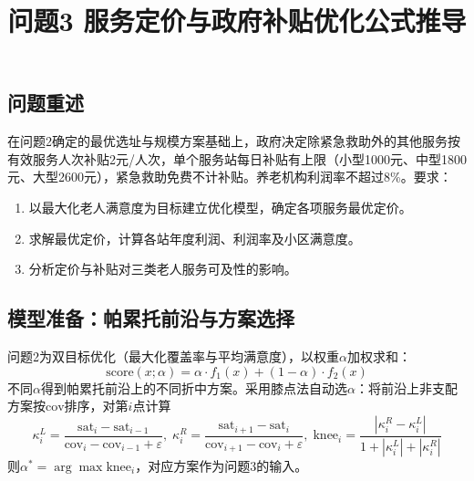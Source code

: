 \documentclass[12pt,a4paper]{article}
\title{问题3 服务定价与政府补贴优化\quad 公式推导}
\date{}
\begin{document}
\maketitle

\subsection{问题重述}
在问题2确定的最优选址与规模方案基础上，政府决定除紧急救助外的其他服务按有效服务人次补贴2元/人次，单个服务站每日补贴有上限（小型1000元、中型1800元、大型2600元），紧急救助免费不计补贴。养老机构利润率不超过8\%。要求：
\begin{enumerate}
    \item 以最大化老人满意度为目标建立优化模型，确定各项服务最优定价。
    \item 求解最优定价，计算各站年度利润、利润率及小区满意度。
    \item 分析定价与补贴对三类老人服务可及性的影响。
\end{enumerate}

\subsection{模型准备：帕累托前沿与方案选择}
问题2为双目标优化（最大化覆盖率与平均满意度），以权重$\alpha$加权求和：
\begin{equation}
\text{score}(x;\alpha) = \alpha\cdot f_1(x) + (1-\alpha)\cdot f_2(x)
\label{eq:pareto}
\end{equation}
不同$\alpha$得到帕累托前沿上的不同折中方案。采用膝点法自动选$\alpha$：将前沿上非支配方案按$\text{cov}$排序，对第$i$点计算
\begin{equation}
\kappa_i^L = \frac{\text{sat}_i - \text{sat}_{i-1}}{\text{cov}_i - \text{cov}_{i-1} + \varepsilon},\;
\kappa_i^R = \frac{\text{sat}_{i+1} - \text{sat}_i}{\text{cov}_{i+1} - \text{cov}_i + \varepsilon},\;
\text{knee}_i = \frac{|\kappa_i^R - \kappa_i^L|}{1 + |\kappa_i^L| + |\kappa_i^R|}
\label{eq:knee}
\end{equation}
则$\alpha^* = \arg\max \text{knee}_i$，对应方案作为问题3的输入。
\end{document}
